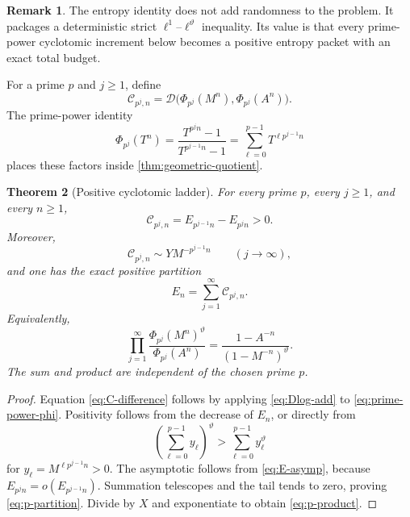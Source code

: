\documentclass[11pt]{article}
\newtheorem{theorem}{Theorem}[section]
\theoremstyle{definition}
\newtheorem{remark}[theorem]{Remark}
\newcommand{\vtheta}{\vartheta}
\newcommand{\Dlog}{\mathscr D}
\begin{document}
\begin{remark}
The entropy identity does not add randomness to the problem.  It packages a deterministic
strict $\ell^1$--$\ell^{\vtheta}$ inequality.  Its value is that every prime-power
cyclotomic increment below becomes a positive entropy packet with an exact total budget.
\end{remark}

For a prime $p$ and $j\ge1$, define
\begin{equation}\label{eq:Cpjn}
 \mathcal C_{p^j,n}
 =\Dlog\bigl(\Phi_{p^j}(M^n),\Phi_{p^j}(A^n)\bigr).
\end{equation}
The prime-power identity
\begin{equation}\label{eq:prime-power-phi}
 \Phi_{p^j}(T^n)
 =\frac{T^{p^jn}-1}{T^{p^{j-1}n}-1}
 =\sum_{\ell=0}^{p-1}T^{\ell p^{j-1}n}
\end{equation}
places these factors inside \cref{thm:geometric-quotient}.

\begin{theorem}[Positive cyclotomic ladder]\label{thm:cyclotomic-ladder}
For every prime $p$, every $j\ge1$, and every $n\ge1$,
\begin{equation}\label{eq:C-difference}
 \mathcal C_{p^j,n}=E_{p^{j-1}n}-E_{p^jn}>0.
\end{equation}
Moreover,
\begin{equation}\label{eq:C-asymp}
 \mathcal C_{p^j,n}\sim Y M^{-p^{j-1}n}
 \qquad(j\to\infty),
\end{equation}
and one has the exact positive partition
\begin{equation}\label{eq:p-partition}
 E_n=\sum_{j=1}^{\infty}\mathcal C_{p^j,n}.
\end{equation}
Equivalently,
\begin{equation}\label{eq:p-product}
 \prod_{j=1}^{\infty}
 \frac{\Phi_{p^j}(M^n)^{\vtheta}}{\Phi_{p^j}(A^n)}
 =\frac{1-A^{-n}}{(1-M^{-n})^{\vtheta}}.
\end{equation}
The sum and product are independent of the chosen prime $p$.
\end{theorem}

\begin{proof}
Equation \eqref{eq:C-difference} follows by applying \eqref{eq:Dlog-add} to
\eqref{eq:prime-power-phi}.  Positivity follows from the decrease of $E_n$, or directly
from
\[
 \left(\sum_{\ell=0}^{p-1}y_\ell\right)^{\vtheta}
 >\sum_{\ell=0}^{p-1}y_\ell^{\vtheta}
\]
for $y_\ell=M^{\ell p^{j-1}n}>0$.  The asymptotic follows from
\eqref{eq:E-asymp}, because $E_{p^jn}=o(E_{p^{j-1}n})$.  Summation telescopes and the tail
tends to zero, proving \eqref{eq:p-partition}.  Divide by $X$ and exponentiate to obtain
\eqref{eq:p-product}.
\end{proof}
\end{document}
